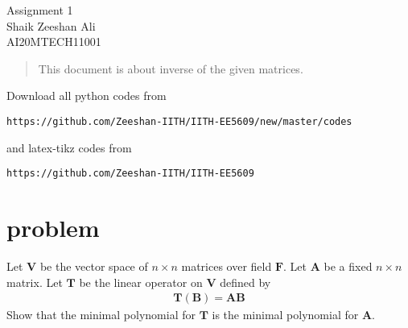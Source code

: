 \documentclass[journal,12pt,twocolumn]{IEEEtran}
\providecommand{\brak}[1]{\ensuremath{\left(#1\right)}}
\numberwithin{equation}{subsection}
\let\vec\mathbf
\begin{document}
\begin{center}
\huge Assignment 1\\

\large Shaik Zeeshan Ali\\
\large AI20MTECH11001\\
\end{center}
\begin{abstract}
This document is about inverse of the given matrices.
\end{abstract}
Download all python codes from 
\begin{lstlisting}
https://github.com/Zeeshan-IITH/IITH-EE5609/new/master/codes
\end{lstlisting}

and latex-tikz codes from 
\begin{lstlisting}
https://github.com/Zeeshan-IITH/IITH-EE5609
\end{lstlisting}
\section{problem}
Let $\vec{V}$ be the vector space of $n\times n$ matrices over field $\vec{F}$. Let $\vec{A}$ be a fixed $n\times n$ matrix. Let $\vec{T}$ be the linear operator on $\vec{V}$ defined by
\begin{align}
    \vec{T\brak{B}}=\vec{AB}
\end{align}
Show that the minimal polynomial for $\vec{T}$ is the minimal polynomial for $\vec{A}$.
\end{document}
